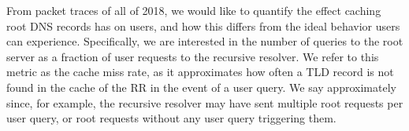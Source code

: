 \documentclass[sigconf,nonacm,10pt]{acmart}
\begin{document}
\label{sec:rr_close_look_discussion} From packet traces of all of 2018,
we would like to quantify the effect caching root DNS records has on
users, and how this differs from the ideal behavior users can
experience. Specifically, we are interested in the number of queries to
the root server as a fraction of user requests to the recursive
resolver. We refer to this metric as the cache miss rate, as it
approximates how often a TLD record is not found in the cache of the RR
in the event of a user query. We say approximately since, for example,
the recursive resolver may have sent multiple root requests per user
query, or root requests without any user query triggering them.

\begin{table}[]
\centering
{}
\end{table}
\end{document}
